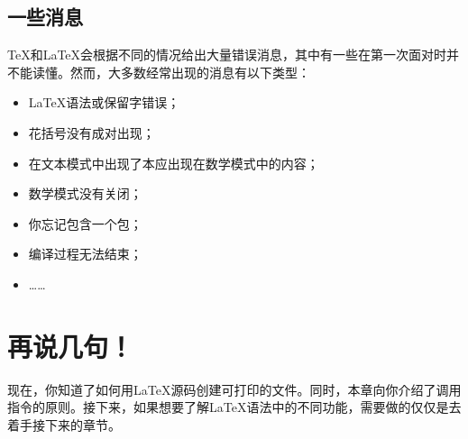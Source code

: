 \subsection{一些消息}

\TeX 和\LaTeX 会根据不同的情况给出大量错误消息，其中有一些在第一次面对时并不能读懂。然而，大多数经常出现的消息有以下类型：

\begin{itemize}
    \item \LaTeX 语法或保留字错误；
    \item 花括号没有成对出现；
    \item 在文本模式中出现了本应出现在数学模式中的内容；
    \item 数学模式没有关闭；
    \item 你忘记包含一个包；
    \item 编译过程无法结束；%
    \item ……
\end{itemize}

\section{再说几句！}

现在，你知道了如何用\LaTeX 源码创建可打印的文件。同时，本章向你介绍了调用指令的原则。接下来，如果想要了解\LaTeX 语法中的不同功能，需要做的仅仅是去着手接下来的章节。%